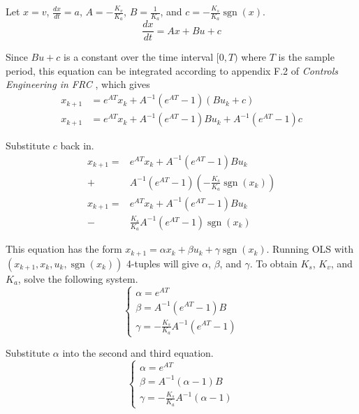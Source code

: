 \documentclass[10pt,conference,compsoc]{IEEEtran}
\DeclareMathOperator{\sgn}{sgn}
\begin{document}
Let $x = v$, $\frac{dx}{dt} = a$, $A = -\frac{K_v}{K_a}$, $B = \frac{1}{K_a}$,
and $c = -\frac{K_s}{K_a}\sgn(x)$.
\begin{equation*}
  \frac{dx}{dt} = Ax + Bu + c
\end{equation*}

Since $Bu + c$ is a constant over the time interval $[0, T)$ where $T$ is the
sample period, this equation can be integrated according to appendix F.2 of
\textit{Controls Engineering in FRC} \cite{bib:controls-in-frc}, which gives
\begin{align*}
  x_{k+1} &= e^{AT} x_k + A^{-1} (e^{AT} - 1) (Bu_k + c) \\
  x_{k+1} &= e^{AT} x_k + A^{-1} (e^{AT} - 1)Bu_k + A^{-1} (e^{AT} - 1)c
\end{align*}

Substitute $c$ back in.
\begin{equation*}
  \begin{aligned}
    x_{k+1} =& e^{AT} x_k + A^{-1} \left(e^{AT} - 1\right) B u_k \\
      +& A^{-1} \left(e^{AT} - 1\right) \left(-\frac{K_s}{K_a} \sgn(x_k)\right)
      \\
    x_{k+1} =& e^{AT} x_k +  A^{-1} \left(e^{AT} - 1\right) B u_k \\
      -& \frac{K_s}{K_a} A^{-1} \left(e^{AT} - 1\right) \sgn(x_k)
  \end{aligned}
\end{equation*}

This equation has the form
$x_{k+1} = \alpha x_k + \beta u_k + \gamma \sgn(x_k)$. Running OLS with
$(x_{k+1}, x_k, u_k, \sgn(x_k))$ 4-tuples will give $\alpha$, $\beta$, and
$\gamma$. To obtain $K_s$, $K_v$, and $K_a$, solve the following system.
\begin{equation*}
  \begin{cases}
    \alpha = e^{AT} \\
    \beta = A^{-1} \left(e^{AT} - 1\right)B \\
    \gamma = -\frac{K_s}{K_a} A^{-1} \left(e^{AT} - 1\right)
  \end{cases}
\end{equation*}

Substitute $\alpha$ into the second and third equation.
\begin{equation}
  \begin{cases}
    \alpha = e^{AT} \\
    \beta = A^{-1} (\alpha - 1) B \\
    \gamma = -\frac{K_s}{K_a} A^{-1} (\alpha - 1)
  \end{cases} \label{eq:system}
\end{equation}
\end{document}

